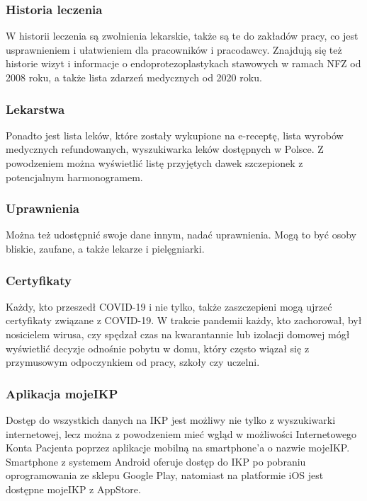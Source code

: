 \documentclass[11pt,a4paper]{article}
\begin{document}
\subsubsection{Historia leczenia}
W historii leczenia są zwolnienia lekarskie, także są te do zakładów pracy, co jest usprawnieniem i ułatwieniem dla pracowników i pracodawcy. Znajdują się też historie wizyt i informacje o endoprotezoplastykach stawowych w ramach NFZ od 2008 roku, a także lista zdarzeń medycznych od 2020 roku.

\subsubsection{Lekarstwa}
Ponadto jest lista leków, które zostały wykupione na e-receptę, lista wyrobów medycznych refundowanych, wyszukiwarka leków dostępnych w Polsce. Z powodzeniem można wyświetlić listę przyjętych dawek szczepionek z potencjalnym harmonogramem. 

\subsubsection{Uprawnienia}
Można też udostępnić swoje dane innym, nadać uprawnienia. Mogą to być osoby bliskie, zaufane, a także lekarze i pielęgniarki.

\subsubsection{Certyfikaty}
Każdy, kto przeszedł COVID-19 i nie tylko, także zaszczepieni mogą ujrzeć certyfikaty związane z COVID-19. W trakcie pandemii każdy, kto zachorował, był nosicielem wirusa, czy spędzał czas na kwarantannie lub izolacji domowej mógł wyświetlić decyzje odnośnie pobytu w domu, który często wiązał się z przymusowym odpoczynkiem od pracy, szkoły czy uczelni.

\subsubsection{Aplikacja mojeIKP}
Dostęp do wszystkich danych na IKP jest możliwy nie tylko z wyszukiwarki internetowej, lecz można z powodzeniem mieć wgląd w możliwości Internetowego Konta Pacjenta poprzez aplikacje mobilną na smartphone'a o nazwie mojeIKP. Smartphone z systemem Android oferuje dostęp do IKP po pobraniu oprogramowania ze sklepu Google Play, natomiast na platformie iOS jest dostępne mojeIKP z AppStore.\\
\end{document}

